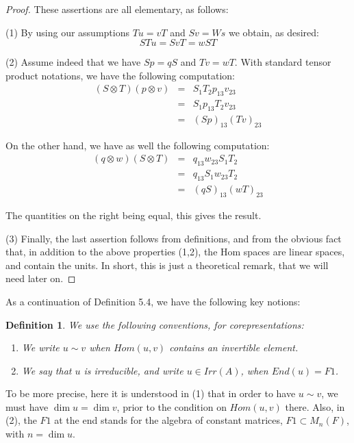 \documentclass[12pt]{amsbook}
\newtheorem{definition}[theorem]{Definition}
\begin{document}
\begin{proof}
These assertions are all elementary, as follows:

\medskip

(1) By using our assumptions $Tu=vT$ and $Sv=Ws$ we obtain, as desired:
$$STu
=SvT
=wST$$

(2) Assume indeed that we have $Sp=qS$ and $Tv=wT$. With standard tensor product notations, we have the following computation:
\begin{eqnarray*}
(S\otimes T)(p\otimes v)
&=&S_1T_2p_{13}v_{23}\\
&=&S_1p_{13}T_2v_{23}\\
&=&(Sp)_{13}(Tv)_{23}
\end{eqnarray*}

On the other hand, we have as well the following computation:
\begin{eqnarray*}
(q\otimes w)(S\otimes T)
&=&q_{13}w_{23}S_1T_2\\
&=&q_{13}S_1w_{23}T_2\\
&=&(qS)_{13}(wT)_{23}
\end{eqnarray*}

The quantities on the right being equal, this gives the result.

\medskip

(3) Finally, the last assertion follows from definitions, and from the obvious fact that, in addition to the above properties (1,2), the Hom spaces are linear spaces, and contain the units. In short, this is just a theoretical remark, that we will need later on.
\end{proof}

As a continuation of Definition 5.4, we have the following key notions:

\begin{definition}
We use the following conventions, for corepresentations:
\begin{enumerate}
\item We write $u\sim v$ when $Hom(u,v)$ contains an invertible element.

\item We say that $u$ is irreducible, and write $u\in Irr(A)$, when $End(u)=F1$.
\end{enumerate}
\end{definition}

To be more precise, here it is understood in (1) that in order to have $u\sim v$, we must have $\dim u=\dim v$, prior to the condition on $Hom(u,v)$ there. Also, in (2), the $F1$ at the end stands for the algebra of constant matrices, $F1\subset M_n(F)$, with $n=\dim u$. 
\end{document}
